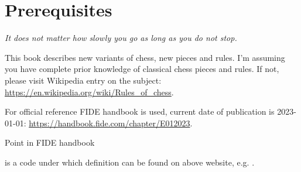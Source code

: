 

\chapter*{Prerequisites}
\label{ch:Prerequisites}

\begin{flushright}
\parbox{0.7\textwidth}{
\emph{It does not matter how slowly you go as long as you do not stop. \newline
{} } }
\end{flushright}

\noindent
This book describes new variants of chess, new pieces and rules. I'm assuming you
have complete prior knowledge of classical chess pieces and rules. If not, please
visit Wikipedia entry on the subject: \newline
\href{https://en.wikipedia.org/wiki/Rules\_of\_chess}{https://en.wikipedia.org/wiki/Rules\_of\_chess}.

For official reference \hypertarget{sec:Prerequisites/FIDE Handbook}{FIDE handbook}
is used, current date of publication is 2023-01-01: \newline
\href{https://handbook.fide.com/chapter/E012023}{https://handbook.fide.com/chapter/E012023}.

\hypertarget{sec:Prerequisites/FIDE point}{Point in FIDE handbook} is a code
under which definition can be found on above website, e.g. .

\clearpage %
